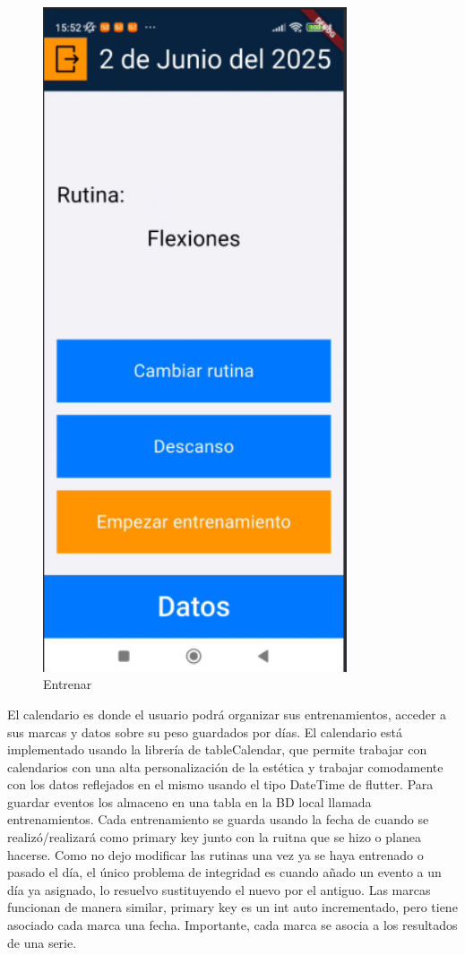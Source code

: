 \begin{figure}[H]
   \centering
    \includegraphics[width=0.8\textwidth]{pantallas/entrenar.png}
    \caption{Entrenar}
    \label{fig:Entrenar}
\end{figure}

El calendario es donde el usuario podrá organizar sus entrenamientos, acceder a sus marcas y datos sobre su peso guardados por días. El calendario está implementado usando la librería de tableCalendar, que permite trabajar con calendarios con una alta personalización de la estética y trabajar comodamente con los datos reflejados en el mismo usando el tipo DateTime de flutter. Para guardar eventos los almaceno en una tabla en la BD local llamada entrenamientos. Cada entrenamiento se guarda usando la fecha de cuando se realizó/realizará como primary key junto con la ruitna que se hizo o planea hacerse. Como no dejo modificar las rutinas una vez ya se haya entrenado o pasado el día, el único problema de integridad es cuando añado un evento a un día ya asignado, lo resuelvo sustituyendo el nuevo por el antiguo. Las marcas funcionan de manera similar, primary key es un int auto incrementado, pero tiene asociado cada marca una fecha. Importante, cada marca se asocia a los resultados de una serie.

